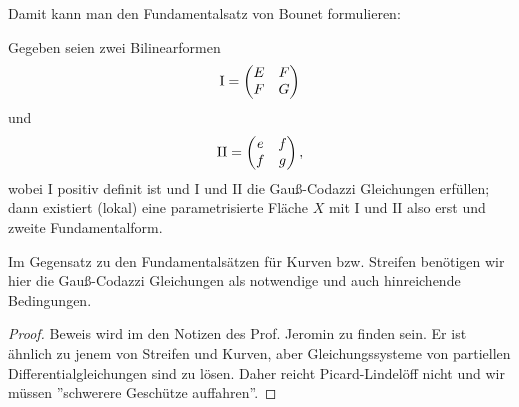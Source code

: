 Damit kann man den Fundamentalsatz von Bounet formulieren:

\begin{theorem}
	Gegeben seien zwei Bilinearformen
		\[ \mathrm{I} = \begin{pmatrix} E & F \\ F & G \end{pmatrix} \] und 
		\[ \mathrm{II} = \begin{pmatrix} e & f \\ f & g \end{pmatrix}, \] wobei $ \mathrm{I} $ positiv definit ist und $ \mathrm{I} $ und $ \mathrm{II} $ die Gauß-Codazzi Gleichungen erfüllen; dann existiert (lokal) eine parametrisierte Fläche $ X $ mit $\mathrm{I}$ und $\mathrm{II}$ also erst und zweite Fundamentalform.
	
\end{theorem}

\begin{remark}
	Im Gegensatz zu den Fundamentalsätzen für Kurven bzw. Streifen benötigen wir hier die Gauß-Codazzi Gleichungen als notwendige und auch hinreichende Bedingungen.
\end{remark}

\begin{proof}
	Beweis wird im den Notizen des Prof. Jeromin zu finden sein.
	Er ist ähnlich zu jenem von Streifen und Kurven, aber Gleichungssysteme von partiellen Differentialgleichungen sind zu lösen. Daher reicht Picard-Lindelöff nicht und wir müssen ''schwerere Geschütze auffahren''.
\end{proof}


